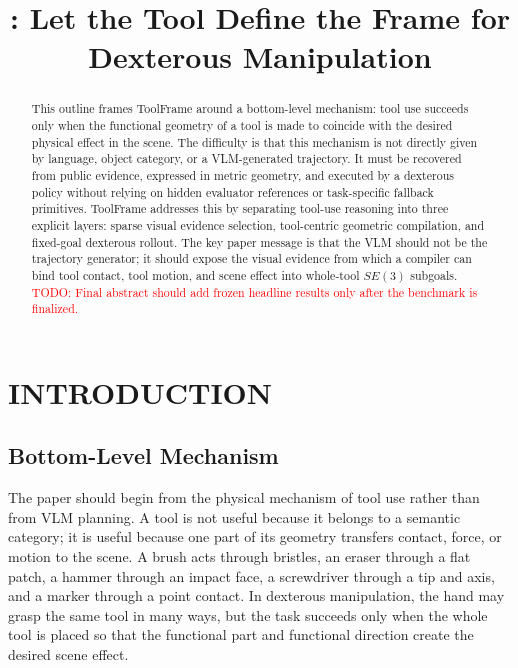 \documentclass[letterpaper, 10 pt, conference]{ieeeconf}
\title{\LARGE \bf
\method{}: Let the Tool Define the Frame for Dexterous Manipulation
}
\author{}
\newcommand{\method}{ToolFrame}
\newcommand{\todo}[1]{\textcolor{red}{TODO: #1}}
\begin{document}
\maketitle
\thispagestyle{empty}
\pagestyle{empty}

\begin{abstract}
This outline frames \method{} around a bottom-level mechanism: tool use succeeds
only when the functional geometry of a tool is made to coincide with the
desired physical effect in the scene. The difficulty is that this mechanism is
not directly given by language, object category, or a VLM-generated trajectory.
It must be recovered from public evidence, expressed in metric geometry, and
executed by a dexterous policy without relying on hidden evaluator references
or task-specific fallback primitives. \method{} addresses this by separating
tool-use reasoning into three explicit layers: sparse visual evidence
selection, tool-centric geometric compilation, and fixed-goal dexterous
rollout. The key paper message is that the VLM should not be the trajectory
generator; it should expose the visual evidence from which a compiler can bind
tool contact, tool motion, and scene effect into whole-tool $SE(3)$ subgoals.
\todo{Final abstract should add frozen headline results only after the
benchmark is finalized.}
\end{abstract}

\section{INTRODUCTION}

\subsection{Bottom-Level Mechanism}
The paper should begin from the physical mechanism of tool use rather than from
VLM planning. A tool is not useful because it belongs to a semantic category;
it is useful because one part of its geometry transfers contact, force, or
motion to the scene. A brush acts through bristles, an eraser through a flat
patch, a hammer through an impact face, a screwdriver through a tip and axis,
and a marker through a point contact. In dexterous manipulation, the hand may
grasp the same tool in many ways, but the task succeeds only when the whole
tool is placed so that the functional part and functional direction create the
desired scene effect.
\end{document}
